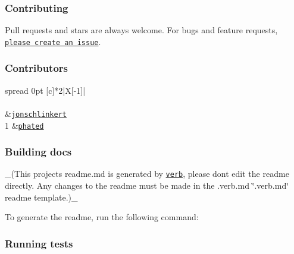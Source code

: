 \subsubsection*{Contributing}

Pull requests and stars are always welcome. For bugs and feature requests, \href{../../issues/new}{\tt please create an issue}.

\subsubsection*{Contributors}

\tabulinesep=1mm
\begin{longtabu} spread 0pt [c]{*{2}{|X[-1]}|}
\hline
\rowcolor{\tableheadbgcolor}\\
\endfirsthead
\hline
\endfoot
\hline
\rowcolor{\tableheadbgcolor}\\
  &\href{https://github.com/jonschlinkert}{\tt jonschlinkert}   \\
1  &\href{https://github.com/phated}{\tt phated}   \\
\end{longtabu}


\subsubsection*{Building docs}

\+\_\+(This project\textquotesingle{}s readme.\+md is generated by \href{https://github.com/verbose/verb-generate-readme}{\tt verb}, please don\textquotesingle{}t edit the readme directly. Any changes to the readme must be made in the .verb.\+md \char`\"{}.\+verb.\+md\char`\"{} readme template.)\+\_\+

To generate the readme, run the following command\+:




\subsubsection*{Running tests}

